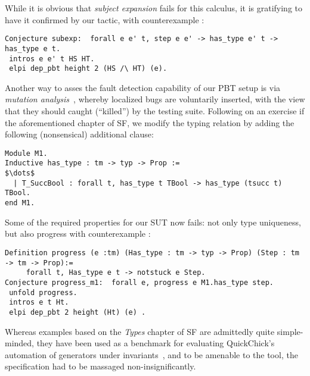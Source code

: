While it is obvious that \emph{subject expansion} fails for this calculus, it is gratifying to have it confirmed by our tactic, with counterexample :
\begin{lstlisting}
Conjecture subexp:  forall e e' t, step e e' -> has_type e' t -> has_type e t. 
 intros e e' t HS HT.
 elpi dep_pbt height 2 (HS /\ HT) (e).
\end{lstlisting}

Another way to asses the fault detection capability of our PBT setup is via \emph{mutation analysis}~\cite{CavadaCM20}, whereby localized bugs are voluntarily inserted, with the view that they should caught (``killed'') by the testing suite. Following on  an exercise if the aforementioned chapter of SF, we modify the typing relation by adding the following (nonsensical) additional clause:

\begin{lstlisting}
Module M1.
Inductive has_type : tm -> typ -> Prop :=
$\dots$
  | T_SuccBool : forall t, has_type t TBool -> has_type (tsucc t) TBool.
end M1.
\end{lstlisting}
Some of the required properties for our SUT now fails: not
only type uniqueness, but also progress with counterexample :
\begin{lstlisting}
Definition progress (e :tm) (Has_type : tm -> typ -> Prop) (Step : tm -> tm -> Prop):= 
     forall t, Has_type e t -> notstuck e Step.
Conjecture progress_m1:  forall e, progress e M1.has_type step.
 unfold progress.
 intros e t Ht.    
 elpi dep_pbt 2 height (Ht) (e) .  
\end{lstlisting}

Whereas examples based on the \emph{Types} chapter of SF are
admittedly quite simple-minded, they have been used as a benchmark for
evaluating \textsf{QuickChick}'s automation of generators under
invariants~\cite{LampropoulosPP18}, and to be amenable to the tool,
the specification had to be massaged non-insignificantly.

